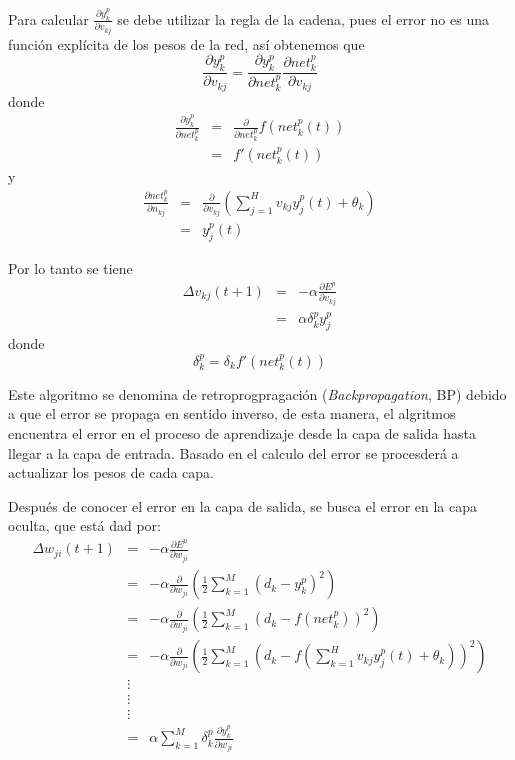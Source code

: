 Para calcular $\frac{\partial y_{k}^{p}}{\partial v_{kj}}$ se debe utilizar la regla de la cadena, pues el error no es una función explícita de los pesos de la red, así obtenemos que $$ \frac{\partial y_{k}^{p}}{\partial v_{kj}} = \frac{\partial y_{k}^{p}}{\partial net_{k}^{p}} \frac{\partial net_{k}^{p}}{\partial v_{kj}} $$
donde
\begin{eqnarray*}
	\frac{\partial y_{k}^{p}}{\partial net_{k}^{p}}	&=& \frac{\partial}{\partial net_{k}^{p}}f(net_{k}^{p}(t))\\
													&=& f'(net_{k}^{p}(t))
\end{eqnarray*}
y
\begin{eqnarray*}
	\frac{\partial net_{k}^{p}}{\partial n_{kj}}	&=& \frac{\partial}{\partial v_{kj}}\left(\sum_{j = 1}^{H} v_{kj}y_{j}^{p}(t) + \theta_{k}\right)\\
														&=& y_{j}^{p}(t)
\end{eqnarray*}

Por lo tanto se tiene
\begin{eqnarray*}
	\Delta v_{kj}(t + 1)	&=& -\alpha\frac{\partial E^{p}}{\partial v_{kj}}\\
							&=& \alpha\delta_{k}^{p}y_{j}^{p}
\end{eqnarray*}
donde $$ \delta_{k}^{p} = \delta_{k}f'(net_{k}^{p}(t))$$

Este algoritmo se denomina de retroprogpragación ({\em Backpropagation}, BP) debido a que el error se propaga en sentido inverso, de esta manera, el algritmos encuentra el error en el proceso de aprendizaje desde la capa de salida hasta llegar a la capa de entrada. Basado en el calculo del error se procesderá a actualizar los pesos de cada capa.

Después de conocer el error en la capa de salida, se busca el error en la capa oculta, que está dad por:
\begin{eqnarray*}
	\Delta w_{ji}(t + 1)	&=& -\alpha\frac{\partial E^{p}}{\partial w_{ji}}\\
							&=& -\alpha\frac{\partial}{\partial w_{ji}} \left(\frac{1}{2}\sum_{k = 1}^{M}\left(d_k - y_{k}^{p}\right)^2\right)\\
							&=& -\alpha\frac{\partial}{\partial w_{ji}} \left(\frac{1}{2}\sum_{k = 1}^{M}\left(d_k - f(net_{k}^{p})\right)^2\right)\\
							&=& -\alpha\frac{\partial}{\partial w_{ji}} \left(\frac{1}{2}\sum_{k = 1}^{M}\left(d_k - f\left(\sum_{k=1}^{H}v_{kj}y_{j}^{p}(t) + \theta_{k}\right)\right)^2\right)\\
							&\vdots&\\
							&\vdots&\\
							&\vdots&\\
							&=& \alpha\sum_{k=1}^{M} \delta_{k}^{p}\frac{\partial y_{k}^{p}}{\partial w_{ji}}\\
\end{eqnarray*}

